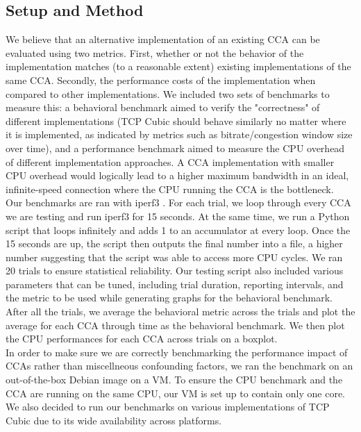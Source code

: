 \documentclass[../main.tex]{subfiles}
\begin{document}
\subsection{Setup and Method}
We believe that an alternative implementation of an existing CCA can be evaluated using two metrics. First, whether or not the behavior of the implementation matches (to a reasonable extent) existing implementations of the same CCA. Secondly, the performance costs of the implementation when compared to other implementations. We included two sets of benchmarks to measure this: a behavioral benchmark aimed to verify the "correctness" of different implementations (TCP Cubic should behave similarly no matter where it is implemented, as indicated by metrics such as bitrate/congestion window size over time), and a performance benchmark aimed to measure the CPU overhead of different implementation approaches. A CCA implementation with smaller CPU overhead would logically lead to a higher maximum bandwidth in an ideal, infinite-speed connection where the CPU running the CCA is the bottleneck. \\
Our benchmarks are ran with iperf3 \cite{iperf}. For each trial, we loop through every CCA we are testing and run iperf3 for 15 seconds. At the same time, we run a Python script that loops infinitely and adds 1 to an accumulator at every loop. Once the 15 seconds are up, the script then outputs the final number into a file, a higher number suggesting that the script was able to access more CPU cycles. We ran 20 trials to ensure statistical reliability. Our testing script also included various parameters that can be tuned, including trial duration, reporting intervals, and the metric to be used while generating graphs for the behavioral benchmark. \\
After all the trials, we average the behavioral metric across the trials and plot the average for each CCA through time as the behavioral benchmark. We then plot the CPU performances for each CCA across trials on a boxplot. \\

In order to make sure we are correctly benchmarking the performance impact of CCAs rather than miscellneous confounding factors, we ran the benchmark on an out-of-the-box Debian image on a VM. To ensure the CPU benchmark and the CCA are running on the same CPU, our VM is set up to contain only one core. We also decided to run our benchmarks on various implementations of TCP Cubic due to its wide availability across platforms.
\end{document}
